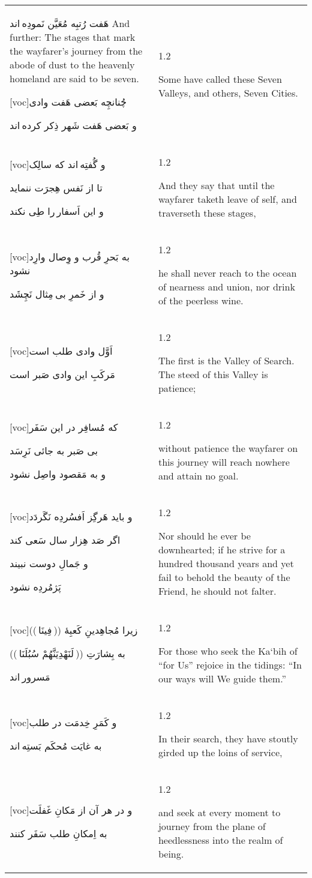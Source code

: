 \documentclass[11pt]{article}
\makeatletter
\newenvironment{orig}
  {\begin{farsi}[voc]}
  {\end{farsi}}
\newenvironment{trans}
  {\large\begin{spacing}{1.2}\raggedright}
  {\end{spacing}}
\newenvironment{word}
  {\begin{longtable}[t]{p{3in}@{\hspace{3em}}p{2.5in}}}
  {\end{longtable}}
\newcommand{\ayat}[2]{
  \begin{orig}#1\end{orig} &
  \vspace{1.5ex}\begin{trans}#2\end{trans} \vspace{-2ex}\\
}
\makeatother
\begin{document}
\begin{word}
{هَفت رُتبِه مُعَيَّن نَمودِه اند}
     {And further: The stages that mark the wayfarer’s journey from the abode
      of dust to the heavenly homeland are said to be seven.}

\ayat{چُنانچِه بَعضی هَفت وادی

و بَعضی هَفت شَهر ذِکر کرده اند}
     {Some have called these Seven Valleys, and others, Seven Cities.}

\ayat{و گُفتِه اند که سالِک

تا از نَفس هِجرَت ننمايد

و اين اَسفار را طِی نکند}
     {And they say that until the wayfarer taketh leave of self, and
      traverseth these stages,}

\ayat{به بَحرِ قُرب و وِصال وارِد نشود

و از خَمرِ بی مِثال نَچِشَد}
     {he shall never reach to the ocean of nearness and union, nor drink of
      the peerless wine.}

\ayat{اَوَّل وادی طلب است

مَرکَبِ اين وادی صَبر است}
     {The first is the Valley of Search. The steed of this Valley is patience;}

\ayat{که مُسافِر در اين سَفَر

بی صَبر به جائی نَرِسَد

و به مَقصود واصِل نشود}
     {without patience the wayfarer on this journey will reach nowhere and
      attain no goal.}

\ayat{و بايد هَرگِز اَفسُردِه نَگَردَد

اگر صَد هِزار سال سَعی کند

و جَمالِ دوست نبيند

پَژمُردِه نشود}
     {Nor should he ever be downhearted; if he strive for a hundred thousand
      years and yet fail to behold the beauty of the Friend, he should not
      falter.}

\ayat{زيرا مُجاهِدينِ کَعبِۀ (( فِينَا ))

به بِشارَتِ (( لَنَهْدِيَنَّهُمْ سُبُلَنَا ))

مَسرور اند}
     {For those who seek the Ka`bih of “for Us” rejoice in the tidings: “In
      our ways will We guide them.”}

\ayat{و کَمَرِ خِدمَت در طلب

به غايَت مُحکَم بَستِه اند}
     {In their search, they have stoutly girded up the loins of service,}

\ayat{و در هر آن از مَکانِ غَفلَت

به اِمکانِ طلب سَفَر کنند}
     {and seek at every moment to journey from the plane of heedlessness into
      the realm of being.}


\end{word}
\end{document}
